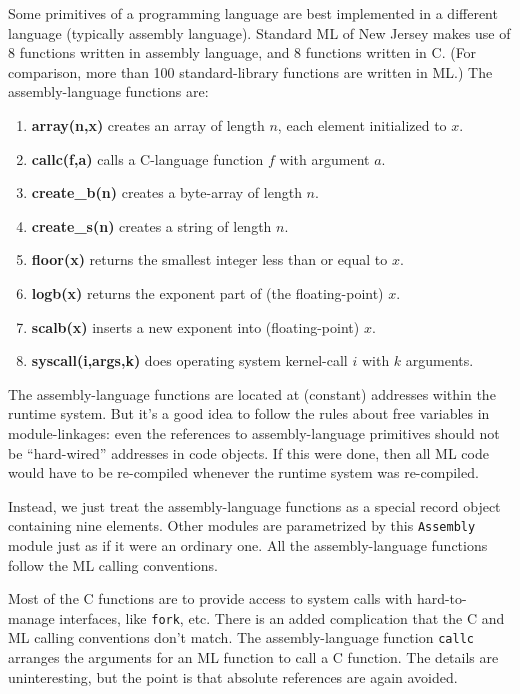 Some primitives of a programming language are best implemented in a different
language (typically assembly language).
Standard ML of New Jersey
makes use of 8 functions written in assembly language, and 8 functions written
in C.
(For comparison, more than 100 standard-library
functions are written
in ML.)  The assembly-language functions are:
\begin{enumerate}
\item {\bf array(n,x)} creates an array of length $n$, each element initialized
to $x$.
\item {\bf callc(f,a)} calls a C-language function $f$ with argument $a$.
\item {\bf create\_b(n)} creates a byte-array of length $n$.
\item {\bf create\_s(n)} creates a string of length $n$.
\item {\bf floor(x)} returns the smallest integer less than
or equal to $x$.
\item {\bf logb(x)} returns the exponent part of (the floating-point) $x$.
\item {\bf scalb(x)} inserts a new exponent into (floating-point) $x$.
\item {\bf syscall(i,args,k)} does operating system
 kernel-call $i$ with
$k$ arguments.
\end{enumerate}
The assembly-language functions are located at (constant) addresses within
the runtime system.  But it's a good idea to follow the rules about
free variables
in module-linkages: even the references to assembly-language
primitives should not be ``hard-wired'' addresses in code objects.
If this were done, then all ML code would have to be re-compiled whenever
the runtime system was re-compiled.

Instead, we just treat the assembly-language functions as a special
record object containing nine elements.  Other modules are parametrized
by this \verb"Assembly" module just as if it were an ordinary one.
All the assembly-language functions follow the ML calling conventions.

Most of the C functions are to provide access to system calls with
hard-to-manage interfaces, like \verb"fork", etc.
There is an added complication that the C and ML calling conventions
don't match.
The assembly-language function \verb"callc" arranges the arguments
for an ML function to call a C function.  The details are uninteresting,
but the point is that absolute references are again avoided.

